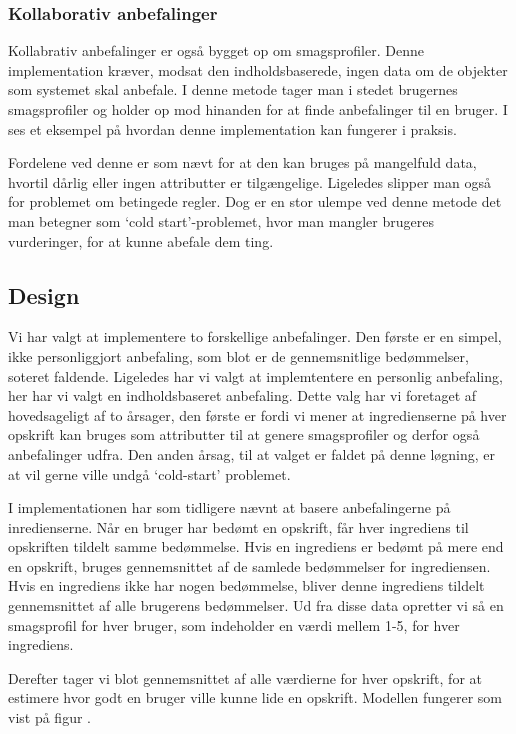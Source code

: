 \subsubsection{Kollaborativ anbefalinger}
Kollabrativ anbefalinger er også bygget op om smagsprofiler.
Denne implementation kræver, modsat den indholdsbaserede, ingen data om de objekter som systemet skal anbefale. I denne metode tager man i stedet brugernes smagsprofiler og holder op mod hinanden for at finde anbefalinger til en bruger. I  ses et eksempel på hvordan denne implementation kan fungerer i praksis.

Fordelene ved denne er som nævt for at den kan bruges på mangelfuld data, hvortil dårlig eller ingen attributter er tilgængelige.
Ligeledes slipper man også for problemet om betingede regler.
Dog er en stor ulempe ved denne metode det man betegner som ‘cold start’-problemet, hvor man mangler brugeres vurderinger, for at kunne abefale dem ting\citep{RecommenderSystems}.


\subsection{Design}
Vi har valgt at implementere to forskellige anbefalinger.
Den første er en simpel, ikke personliggjort anbefaling, som blot er de gennemsnitlige bedømmelser, soteret faldende.
Ligeledes har vi valgt at implemtentere en personlig anbefaling, her har vi valgt en indholdsbaseret anbefaling.
Dette valg har vi foretaget af hovedsageligt af to årsager, den første er fordi vi mener at ingredienserne på hver opskrift kan bruges som attributter til at genere smagsprofiler og derfor også anbefalinger udfra.
Den anden årsag, til at valget er faldet på denne løgning, er at vil gerne ville undgå ‘cold-start’ problemet.

I implementationen har som tidligere nævnt at basere anbefalingerne på inredienserne.
Når en bruger har bedømt en opskrift, får hver ingrediens til opskriften tildelt samme bedømmelse.
Hvis en ingrediens er bedømt på mere end en opskrift, bruges gennemsnittet af de samlede bedømmelser for ingrediensen.
Hvis en ingrediens ikke har nogen bedømmelse, bliver denne ingrediens tildelt gennemsnittet af alle brugerens bedømmelser.
Ud fra disse data opretter vi så en smagsprofil for hver bruger, som indeholder en værdi mellem 1-5, for hver ingrediens.

Derefter tager vi blot gennemsnittet af alle værdierne for hver opskrift, for at estimere hvor godt en bruger ville kunne lide en opskrift.
Modellen fungerer som vist på figur .


